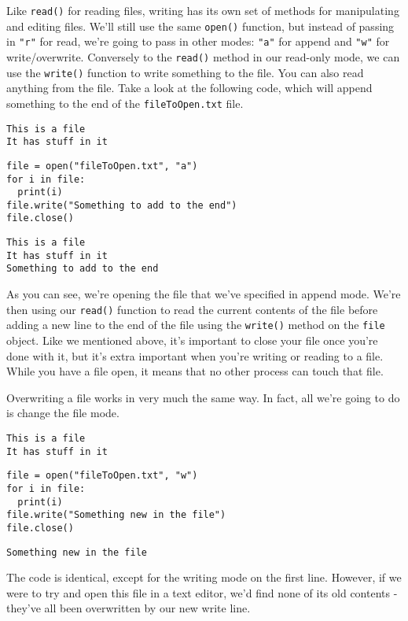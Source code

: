 Like \verb|read()| for reading files, writing has its own set of methods for manipulating and editing files. We'll still use the same \verb|open()| function, but instead of passing in \verb|"r"| for read, we're going to pass in other modes: \verb|"a"| for append and \verb|"w"| for write/overwrite. Conversely to the \verb|read()| method in our read-only mode, we can use the \verb|write()| function to write something to the file. You can also read anything from the file. Take a look at the following code, which will append something to the end of the \verb|fileToOpen.txt| file.\par
\begin{lstlisting}
This is a file
It has stuff in it
\end{lstlisting}
\begin{lstlisting}[style=pippython]
file = open("fileToOpen.txt", "a")
for i in file:
  print(i)
file.write("Something to add to the end")
file.close()
\end{lstlisting}
\begin{lstlisting}
This is a file
It has stuff in it
Something to add to the end
\end{lstlisting}
As you can see, we're opening the file that we've specified in append mode. We're then using our \verb|read()| function to read the current contents of the file before adding a new line to the end of the file using the \verb|write()| method on the \verb|file| object. Like we mentioned above, it's important to close your file once you're done with it, but it's extra important when you're writing or reading to a file. While you have a file open, it means that no other process can touch that file.\par
Overwriting a file works in very much the same way. In fact, all we're going to do is change the file mode.\par
\begin{lstlisting}
This is a file
It has stuff in it
\end{lstlisting}
\begin{lstlisting}[style=pippython]
file = open("fileToOpen.txt", "w")
for i in file:
  print(i)
file.write("Something new in the file")
file.close()
\end{lstlisting}
\begin{lstlisting}
Something new in the file
\end{lstlisting}
The code is identical, except for the writing mode on the first line. However, if we were to try and open this file in a text editor, we'd find none of its old contents - they've all been overwritten by our new write line.\par
